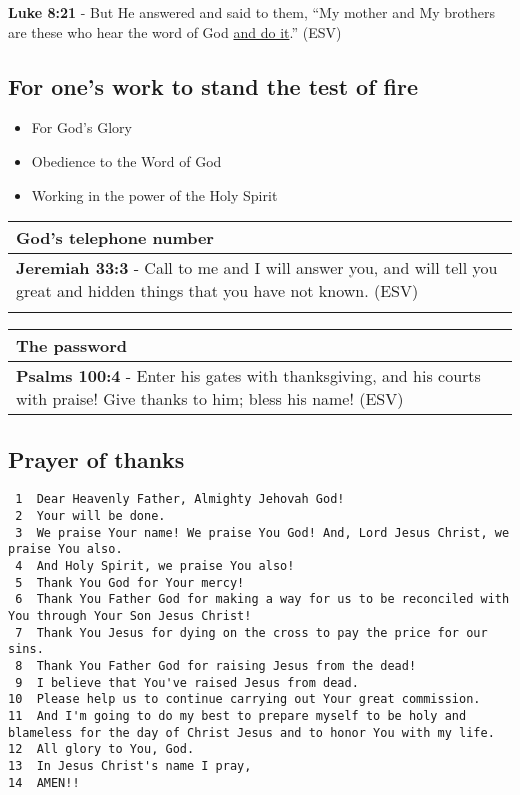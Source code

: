\documentclass[11pt]{article}
\begin{document}
\textbf{Luke 8:21} - But He answered and said to them, “My mother and My brothers are these who hear the word of God \uline{and do it}.” (ESV)

\subsection{For one's work to stand the test of fire}
\label{sec:orgdb219b6}
\begin{itemize}
\item For God's Glory
\item Obedience to the Word of God
\item Working in the power of the Holy Spirit
\end{itemize}

\begin{center}
\begin{tabular}{l}
God's telephone number\\[0pt]
\hline
\textbf{Jeremiah 33:3} - Call to me and I will answer you, and will tell you great and hidden things that you have not known. (ESV)\\[0pt]
\\[0pt]
\end{tabular}
\end{center}

\begin{center}
\begin{tabular}{l}
The password\\[0pt]
\hline
\textbf{Psalms 100:4} -  Enter his gates with thanksgiving, and his courts with praise! Give thanks to him; bless his name!  (ESV)\\[0pt]
\end{tabular}
\end{center}

\subsection{Prayer of thanks}
\label{sec:org9fcb089}
\begin{verbatim}
 1  Dear Heavenly Father, Almighty Jehovah God!
 2  Your will be done.
 3  We praise Your name! We praise You God! And, Lord Jesus Christ, we praise You also.
 4  And Holy Spirit, we praise You also!
 5  Thank You God for Your mercy! 
 6  Thank You Father God for making a way for us to be reconciled with You through Your Son Jesus Christ!
 7  Thank You Jesus for dying on the cross to pay the price for our sins.
 8  Thank You Father God for raising Jesus from the dead!
 9  I believe that You've raised Jesus from dead.
10  Please help us to continue carrying out Your great commission.
11  And I'm going to do my best to prepare myself to be holy and blameless for the day of Christ Jesus and to honor You with my life.
12  All glory to You, God.
13  In Jesus Christ's name I pray,
14  AMEN!!
\end{verbatim}
\end{document}
